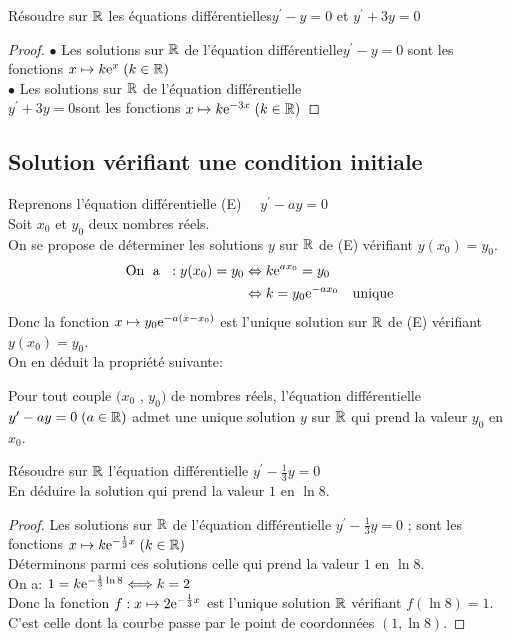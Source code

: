 \begin{example}
Résoudre sur $ \mathbb{R} $ les équations différentielles\;$ y^{\prime}-y=0 $\;  et\; $ y^{\prime}+3y=0 $
\end{example}
\begin{proof}
$ \bullet $ Les solutions sur $ \mathbb{R} $ de l'équation différentielle\;$ y^{\prime}-y=0 $  sont les fonctions  $ x\mapsto k\mathrm{e}^{x}\; (k\in\mathbb{R}) $\\
$ \bullet $ Les solutions sur $ \mathbb{R} $ de l'équation différentielle\\                                         $ y^{\prime}+3y=0 $\;sont les fonctions  $ x\mapsto k\mathrm{e}^{-3x}\; (k\in\mathbb{R}) $
\end{proof}
\subsection*{Solution vérifiant une condition initiale}

Reprenons l'équation différentielle (E)  $\quad  y^{\prime}-ay=0 $\\
Soit $ x_{0}$ et $y_{0} $  deux nombres réels.\\
On se propose de déterminer les solutions  $ y $ sur $ \mathbb{R} $  de (E)  vérifiant \; $ y(x_{0})=y_{0} $.
\begin{align*}
\text{On \;a }\;: y(x_{0})=y_{0} &\Leftrightarrow k\mathrm{e}^{ax_{0}}=y_{0}\\
&\Leftrightarrow k=y_{0}\mathrm{e}^{-ax_{0}}\quad \text{unique}
\end{align*}
Donc la fonction \; $ x\mapsto y_{0}\mathrm{e}^{-a(x-x_{0})} $\; est l'unique solution sur $ \mathbb{R} $  de (E)  vérifiant \; $ y(x_{0})=y_{0} $.\\
On en déduit la propriété suivante:

\begin{property}
Pour tout couple \;$ (x_{0}$ , $y_{0}) $\; de nombres réels, l'équation différentielle  \; $ y^{\prime}-ay=0 \;(a\in\mathbb{R})$\; admet une unique solution $ y $ sur $ \mathbb{R} $  qui prend la valeur $y_{0} $ en $x_{0} $.
\end{property}

\begin{exercice}
Résoudre sur $ \mathbb{R} $ l'équation  différentielle \; $ y^{\prime}-\frac{1}{3}y=0 $\\ 
En déduire la solution qui prend la valeur $1 $ en $ \ln 8$.

\end{exercice}
\begin{proof}
Les solutions sur $ \mathbb{R} $ de l'équation  différentielle \; $ y^{\prime}-\frac{1}{3}y=0 $\; ; \; sont les fonctions  $ x\mapsto k\mathrm{e}^{-\frac{1}{3}x}\; (k\in\mathbb{R}) $\\
Déterminons parmi ces solutions celle qui prend la valeur $1 $ en $ \ln 8$.\\ On a:\; $ 1=k\mathrm{e}^{-\frac{1}{3}\ln 8} \Longleftrightarrow k=2$\\
Donc la fonction \;$f:  x\mapsto 2\mathrm{e}^{-\frac{1}{3}x} $  est l'unique solution $ \mathbb{R} $  vérifiant \;$ f(\ln 8)=1 $. C'est celle  dont la courbe passe par le point de coordonnées \;$ (1, \ln 8) $.
\end{proof}
